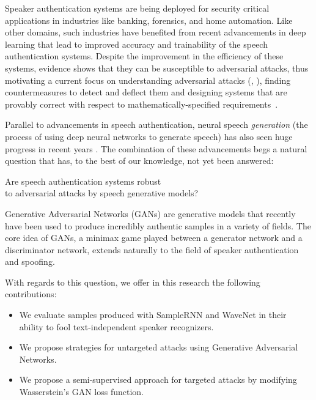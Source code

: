 Speaker authentication systems are being deployed for security critical
applications in industries like banking, forensics, and home automation. Like
other domains, such industries have benefited from recent advancements in deep
learning that lead to improved accuracy and trainability of the speech
authentication systems.  Despite the improvement in the efficiency of these
systems, evidence shows that they can be susceptible to adversarial
attacks\cite{wu2015spoofing}, thus motivating a current focus on understanding
adversarial attacks (\cite{szegedy2013intriguing},
\cite{goodfellow2014explaining}), finding countermeasures to detect and deflect
them and designing systems that are provably correct with respect to
mathematically-specified requirements~\cite{seshia2016vai}.

Parallel to advancements in speech authentication, neural speech
\textit{generation} (the process of using deep neural networks to generate
speech) has also seen huge progress in recent years \cite{wang2017tacotron}.  The combination of these advancements begs a natural
question that has, to the best of our knowledge, not yet been answered:
\begin{center}
Are speech authentication systems robust \\to adversarial attacks by speech generative models?
\end{center}

Generative Adversarial Networks (GANs) are generative models that recently have
been used to produce incredibly authentic samples in a variety of fields. The
core idea of GANs, a minimax game played between a generator network and a
discriminator network, extends naturally to the field of speaker authentication
and spoofing. 

With regards to this question, we offer in this research the following contributions:
\begin{itemize}
\item We evaluate samples produced with SampleRNN and WaveNet in their ability to fool text-independent speaker recognizers.
\item We propose strategies for untargeted attacks using Generative Adversarial Networks.
\item We propose a semi-supervised approach for targeted attacks by modifying
    Wasserstein's GAN loss function.
\end{itemize}

